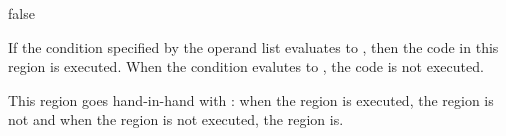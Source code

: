 \begin{instruction}{false}

  \begin{notes}
    If the condition specified by the operand list evaluates to
    , then the code in this region is executed.  When the
    condition evalutes to , the code is not executed.

    This region goes hand-in-hand with : when
    the  region is executed, the  region
    is not and when the  region is not executed, the
     region is.
  \end{notes}

  \nresults

  \begin{operands}
  \item {}
  \end{operands}

  \begin{seealso}
  \end{seealso}
\end{instruction}

